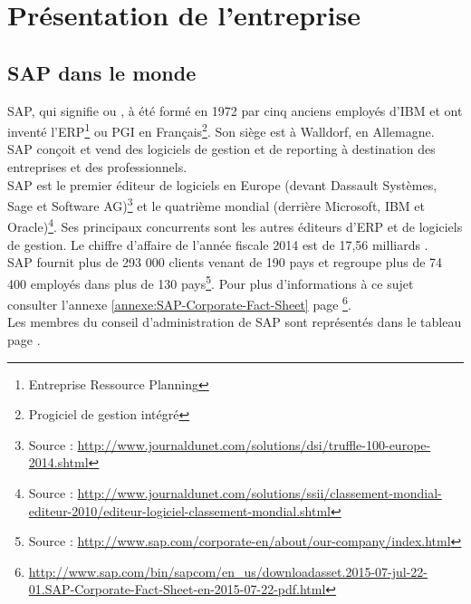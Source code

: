 \chapter{Pr\'{e}sentation de l'entreprise}
\section{SAP dans le monde}

SAP, qui signifie  ou , à été formé en 1972 par cinq anciens employés d'IBM et ont inventé l'ERP\footnote{Entreprise Ressource Planning} ou PGI en Français\footnote{Progiciel de gestion intégré}. Son siège est à Walldorf, en Allemagne. SAP conçoit et vend des logiciels de gestion et de reporting à destination des entreprises et des professionnels.\\

SAP est le premier éditeur de logiciels en Europe (devant Dassault Systèmes, Sage et Software AG)\footnote{Source : \url{http://www.journaldunet.com/solutions/dsi/truffle-100-europe-2014.shtml}} et le quatrième mondial (derrière Microsoft, IBM et Oracle)\footnote{Source : \url{http://www.journaldunet.com/solutions/ssii/classement-mondial-editeur-2010/editeur-logiciel-classement-mondial.shtml}}. Ses principaux concurrents sont les autres éditeurs d'ERP et de logiciels de gestion. Le chiffre d'affaire de l'année fiscale 2014 est de 17,56 milliards \texteuro.\\

SAP fournit plus de 293 000 clients venant de 190 pays et regroupe plus de 74 400 employés dans plus de 130 pays\footnote{Source : \url{http://www.sap.com/corporate-en/about/our-company/index.html}}. Pour plus d'informations à ce sujet consulter l'annexe \ref{annexe:SAP-Corporate-Fact-Sheet} page \pageref{annexe:SAP-Corporate-Fact-Sheet}\footnote{\url{http://www.sap.com/bin/sapcom/en_us/downloadasset.2015-07-jul-22-01.SAP-Corporate-Fact-Sheet-en-2015-07-22-pdf.html}}.\\
Les membres du conseil d'administration de SAP sont représentés dans le tableau page \pageref{table:board}.\\




